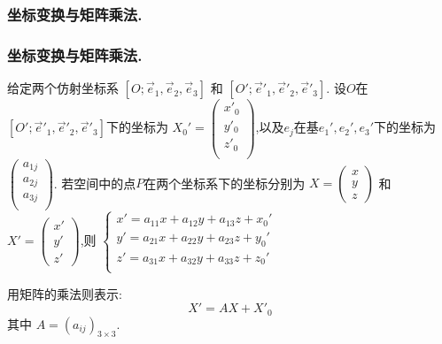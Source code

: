 \subsubsection{坐标变换与矩阵乘法.}
\begin{frame}\frametitle{坐标变换与矩阵乘法.}
给定两个仿射坐标系 $[O;\vec{e}_1,\vec{e}_2,\vec{e}_3]$ 和 $[O';\vec{e}'_1,\vec{e}'_2,\vec{e}'_3]$. 设$O$在$[O';\vec{e}'_1,\vec{e}'_2,\vec{e}'_3]$下的坐标为
$X_0'=\begin{pmatrix} x'_0\\y'_0\\z'_0\\ \end{pmatrix}$,以及$e_j$在基$e_1',e_2',e_3'$下的坐标为$\begin{pmatrix} a_{1j}\\a_{2j}\\a_{3j}\\\end{pmatrix}$. \pp
若空间中的点$P$在两个坐标系下的坐标分别为 $X=\begin{pmatrix}x\\y\\z \end{pmatrix}$ 和 $X'=\begin{pmatrix}x'\\y'\\z' \end{pmatrix}$,则 $\left\{\begin{array}{l}
x' = a_{11}x+a_{12}y+a_{13}z+x_0'\\
y' = a_{21}x+a_{22}y+a_{23}z+y_0'\\
z' = a_{31}x+a_{32}y+a_{33}z+z_0'\\\end{array}\right.$

\pp
用矩阵的乘法则表示:
\[X' = AX+X'_0\]
其中 $A=(a_{ij})_{3\times3}$.
\end{frame}


